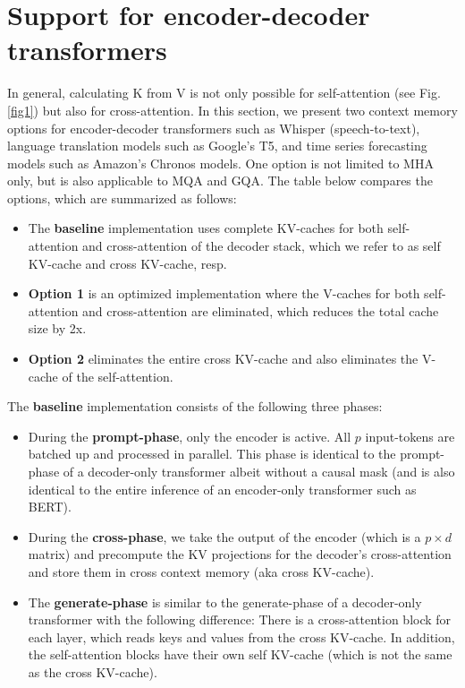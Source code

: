 \documentclass{article}
\begin{document}
\section{Support for encoder-decoder transformers}
In general, calculating K from V is not only possible for self-attention (see Fig. \ref{fig1}) but also for cross-attention. In this section, we present two context memory options for encoder-decoder transformers such as Whisper (speech-to-text), language translation models such as Google’s T5, and time series forecasting models such as Amazon’s Chronos models. One option is not limited to MHA only, but is also applicable to MQA and GQA. The table below compares the options, which are summarized as follows:
\begin{itemize}[topsep=-1pt, itemsep=-1pt]
  \item The \textbf{baseline} implementation uses complete KV-caches for both self-attention and cross-attention of the decoder stack, which we refer to as self KV-cache and cross KV-cache, resp.
  \item \textbf{Option 1} is an optimized implementation where the V-caches for both self-attention and cross-attention are eliminated, which reduces the total cache size by 2x.
  \item \textbf{Option 2} eliminates the entire cross KV-cache and also eliminates the V-cache of the self-attention.
\end{itemize}
The \textbf{baseline} implementation consists of the following three phases:
\begin{itemize}[topsep=-1pt, itemsep=-1pt]
  \item During the \textbf{prompt-phase}, only the encoder is active. All $p$ input-tokens are batched up and processed in parallel. This phase is identical to the prompt-phase of a decoder-only transformer albeit without a causal mask (and is also identical to the entire inference of an encoder-only transformer such as BERT).
  \item During the \textbf{cross-phase}, we take the output of the encoder (which is a $p \times d$ matrix) and precompute the KV projections for the decoder’s cross-attention and store them in cross context memory (aka cross KV-cache).
  \item The \textbf{generate-phase} is similar to the generate-phase of a decoder-only transformer with the following difference: There is a cross-attention block for each layer, which reads keys and values from the cross KV-cache. In addition, the self-attention blocks have their own self KV-cache (which is not the same as the cross KV-cache).
\end{itemize}
\end{document}
